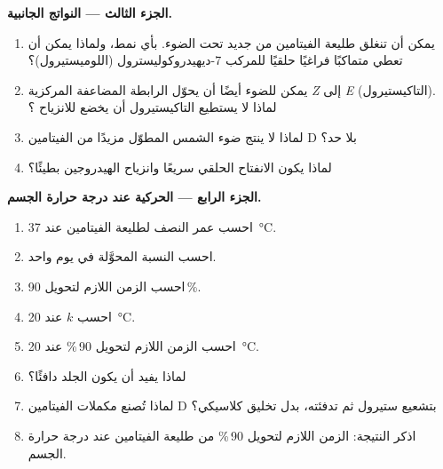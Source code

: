 \begin{problem}
\medskip\noindent\textbf{الجزء الثالث --- النواتج الجانبية.}
\begin{enumerate}[resume]
  \item يمكن أن تنغلق طليعة الفيتامين  من جديد تحت الضوء. بأي نمط، ولماذا يمكن أن تعطي
        متماكبًا فراغيًا حلقيًا للمركب 7-ديهيدروكوليسترول (اللوميستيرول)؟
  \item يمكن للضوء أيضًا أن يحوّل الرابطة المضاعفة المركزية \textit{Z} إلى \textit{E} (التاكيستيرول). لماذا
        لا يستطيع التاكيستيرول أن يخضع للانزياح ؟
  \item لماذا لا ينتج ضوء الشمس المطوّل مزيدًا من الفيتامين D بلا حد؟
  \item لماذا يكون الانفتاح الحلقي سريعًا وانزياح الهيدروجين بطيئًا؟
\end{enumerate}

\medskip\noindent\textbf{الجزء الرابع --- الحركية عند درجة حرارة الجسم.}
\begin{enumerate}[resume]
  \item احسب عمر النصف لطليعة الفيتامين  عند \qty{37}{\celsius}.
  \item احسب النسبة المحوَّلة في يوم واحد.
  \item احسب الزمن اللازم لتحويل 90\,\%.
  \item احسب $k$ عند \qty{20}{\celsius}.
  \item احسب الزمن اللازم لتحويل 90\,\% عند \qty{20}{\celsius}.
  \item لماذا يفيد أن يكون الجلد دافئًا؟
  \item لماذا تُصنع مكملات الفيتامين D بتشعيع ستيرول ثم تدفئته،
        بدل تخليق كلاسيكي؟
  \item اذكر النتيجة: الزمن اللازم لتحويل 90\,\% من طليعة الفيتامين  عند درجة حرارة الجسم.
\end{enumerate}
\end{problem}
